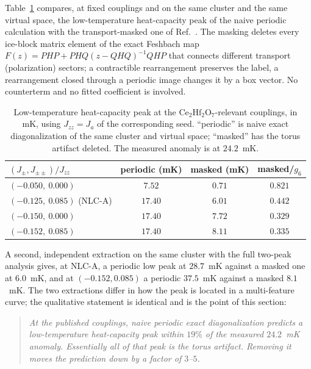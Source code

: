 \documentclass[aps,prb,preprint,amsmath,amssymb,superscriptaddress,
longbibliography,floatfix]{revtex4-2}
\newcommand{\Jzz}{J_{zz}}
\newcommand{\Jpm}{J_{\pm}}
\newcommand{\Jpmpm}{J_{\pm\pm}}
\newcommand{\CHO}{\mathrm{Ce_2Hf_2O_7}}
\begin{document}
Table~\ref{tab:artifact} compares, at fixed couplings and on the same cluster
and the same virtual space, the low-temperature heat-capacity peak of the naive
periodic calculation with the transport-masked one of Ref.~\cite{ZhouKimMask}.
The masking deletes every ice-block matrix element of the exact Feshbach map
$F(z)=PHP+PHQ(z-QHQ)^{-1}QHP$ that connects different transport (polarization)
sectors; a contractible rearrangement preserves the label, a rearrangement
closed through a periodic image changes it by a box vector.  No counterterm and
no fitted coefficient is involved.

\begin{table}[t]
\caption{Low-temperature heat-capacity peak at the $\CHO$-relevant couplings,
in mK, using $\Jzz=J_a$ of the corresponding seed.  ``periodic'' is naive exact
diagonalization of the same cluster and virtual space; ``masked'' has the torus
artifact deleted.  The measured anomaly is at $24.2$~mK.}
\label{tab:artifact}
\begin{ruledtabular}
\begin{tabular}{lccc}
$(\Jpm,\Jpmpm)/\Jzz$ & periodic (mK) & masked (mK) & masked/$g_6$\\ \hline
$(-0.050,\ 0.000)$ & $7.52$  & $0.71$ & $0.821$\\
$(-0.125,\ 0.085)$ (NLC-A) & $17.40$ & $6.01$ & $0.442$\\
$(-0.150,\ 0.000)$ & $17.40$ & $7.72$ & $0.329$\\
$(-0.152,\ 0.085)$ & $17.40$ & $8.11$ & $0.335$\\
\end{tabular}
\end{ruledtabular}
\end{table}

A second, independent extraction on the same cluster with the full two-peak
analysis gives, at NLC-A, a periodic low peak at $28.7$~mK against a masked one
at $6.0$~mK, and at $(-0.152,0.085)$ a periodic $37.5$~mK against a masked
$8.1$~mK.  The two extractions differ in how the peak is located in a
multi-feature curve; the qualitative statement is identical and is the point of
this section:

\begin{quote}
\emph{At the published couplings, naive periodic exact diagonalization predicts
a low-temperature heat-capacity peak within $19\%$ of the measured $24.2$~mK
anomaly.  Essentially all of that peak is the torus artifact.  Removing it moves
the prediction down by a factor of $3$--$5$.}
\end{quote}
\end{document}
